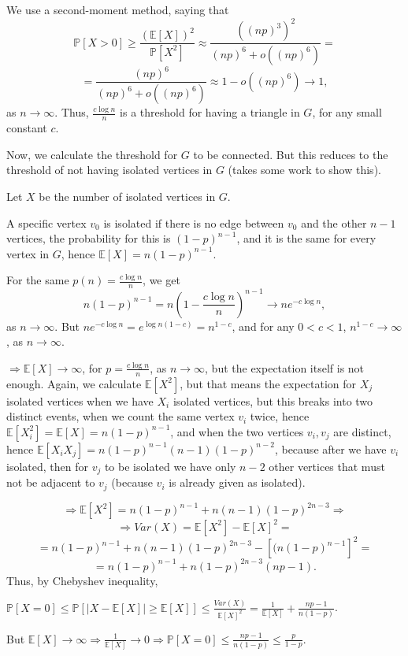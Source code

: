 \documentclass{article}
\begin{document}
We use a second-moment method, saying that \[\mathbb{P}[X>0]\geq\frac{(\mathbb{E}[X])^2}{\mathbb{P}[X^2]}\approx\frac{((np)^3)^2}{(np)^6+o((np)^6)}=\]\[=\frac{(np)^6}{(np)^6+o((np)^6)}\approx{1-o((np)^6)}\rightarrow{1},\]
as $n\rightarrow\infty$.
Thus, $\frac{c\log{n}}{n}$ is a threshold for having a triangle in $G$, for any small constant $c$.

Now, we calculate the threshold for $G$ to be connected. But this reduces to the threshold of not having isolated vertices in $G$ (takes some work to show this).

Let $X$ be the number of isolated vertices in $G$. 

A specific vertex $v_0$ is isolated if there is no edge between $v_0$ and the other $n-1$ vertices, the probability for this is $(1-p)^{n-1}$, and it is the same for every vertex in $G$, hence $\mathbb{E}[X]=n(1-p)^{n-1}$.

For the same $p(n)=\frac{c\log{n}}{n}$, we get 
\[n(1-p)^{n-1}=n(1-\frac{c\log{n}}{n})^{n-1}\rightarrow{n}e^{-c\log{n}},\]
as $n\rightarrow\infty$.
But $ne^{-c\log{n}}=e^{\log{n}(1-c)}=n^{1-c}$, and for any $0<{c}<1$, $n^{1-c}\rightarrow\infty$, as $n\rightarrow\infty$.

$\Rightarrow\mathbb{E}[X]\rightarrow\infty$, for $p=\frac{c\log{n}}{n}$, as $n\rightarrow\infty$, but the expectation itself is not enough. Again, we calculate $\mathbb{E}[X^2]$, but that means the expectation for $X_j$ isolated vertices when we have $X_i$ isolated vertices, but this breaks into two distinct events, when we count the same vertex $v_i$ twice, hence $\mathbb{E}[X_i^2]=\mathbb{E}[X]=n(1-p)^{n-1}$, and when the two vertices $v_i,v_j$ are distinct, hence $\mathbb{E}[X_iX_j]=n(1-p)^{n-1}(n-1)(1-p)^{n-2}$, because after we have $v_i$ isolated, then for $v_j$ to be isolated we have only $n-2$ other vertices that must not be adjacent to $v_j$ (because $v_i$ is already given as isolated).

\[\Rightarrow\mathbb{E}[X^2]=n(1-p)^{n-1}+n(n-1)(1-p)^{2n-3}\Rightarrow\]\[\Rightarrow{Var(X)=\mathbb{E}[X^2]-\mathbb{E}[X]^2}=\]\[=n(1-p)^{n-1}+n(n-1)(1-p)^{2n-3}-[(n(1-p)^{n-1}]^2=\]\[=n(1-p)^{n-1}+n(1-p)^{2n-3}(np-1).\]
Thus, by Chebyshev inequality,

$\mathbb{P}[X=0]\leq\mathbb{P}[|X-\mathbb{E}[X]|\geq\mathbb{E}[X]]\leq\frac{Var(X)}{\mathbb{E}[X]^2}=\frac{1}{\mathbb{E}[X]}+\frac{np-1}{n(1-p)}$. 

But $\mathbb{E}[X]\rightarrow\infty\Rightarrow\frac{1}{\mathbb{E}[X]}\rightarrow{0}\Rightarrow\mathbb{P}[X=0]\leq\frac{np-1}{n(1-p)}\leq\frac{p}{1-p}$.
\end{document}
